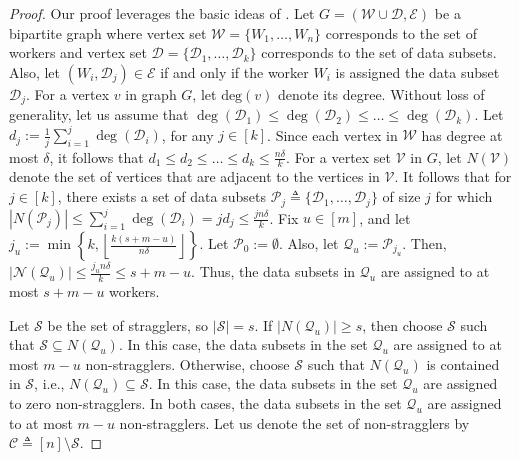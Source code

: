 \documentclass[journal,draftcls,onecolumn]{IEEEtran}
\theoremstyle{mystyle}
\newcommand{\floor}[1]{\left\lfloor #1\right\rfloor}
\begin{document}
\label{sec:lowerbound_proof}
\begin{proof}
Our proof leverages the basic ideas of \cite{dimakis_cyclic_mds}.
 Let $G = (\mathcal{W} \cup \mathcal{D}, \mathcal{E})$ be a bipartite graph where vertex set $\mathcal{W} = \{W_1 , \dots, W_n\}$ corresponds to the set of workers and vertex set $\mathcal{D} = \{ \mathcal{D}_1, \dots , \mathcal{D}_k\}$ corresponds to the set of data subsets. Also, let $(W_i,\mathcal{D}_j) \in \mathcal{E}$ if and only if the worker $W_i$ is assigned the data subset $\mathcal{D}_j$. For a vertex $v$ in graph $G$, let $\text{deg}(v)$ denote its degree. Without loss of generality, let us assume that $\deg(\mathcal{D}_1) \le \deg(\mathcal{D}_2) \le \dots \le \deg(\mathcal{D}_{k})$. Let $d_{j} := \frac{1}{j} \sum_{i = 1}^j \deg(\mathcal{D}_i)$, for any $j \in [k]$. Since each vertex in $\mathcal{W}$ has degree at most $\delta$, it follows that $d_1 \le d_2 \le \dots \le d_{k} \le \frac{n \delta}{k}$. For a vertex set $\mathcal{V}$ in $G$, let $N(\mathcal{V})$ denote the set of vertices that are adjacent to the vertices in $\mathcal{V}$. It follows that for $j \in [k]$, there exists a set of data subsets $\mathcal{P}_{j} \triangleq \{\mathcal{D}_1, \dots, \mathcal{D}_j\}$ of size $j$ for which $|N(\mathcal{P}_j)| \le \sum_{i = 1}^j \deg(\mathcal{D}_i) = jd_j \le {}\frac{jn \delta}{k}$. Fix $u \in [m]$,  and let
$
j_u:=\min\left\{k,
\left\lfloor\frac{k(s+m-u)}{n\delta}\right\rfloor\right\}$. Let $\mathcal{P}_0:=\emptyset$. Also, let $\mathcal{Q}_u:=\mathcal{P}_{j_u}$. Then,
$
|\mathcal{N}(\mathcal{Q}_u)|
\leq \frac{j_u n\delta}{k}
\leq s+m-u.
$
Thus, the data subsets in $\mathcal{Q}_u$ are assigned to at most
$s+m-u$ workers.

Let $\mathcal{S}$ be the set of stragglers, so $|\mathcal{S}| = s$. If $|N(\mathcal{Q}_u)| \ge s$, then choose $\mathcal{S}$ such that $\mathcal{S} \subseteq N(\mathcal{Q}_u)$. In this case, the data subsets in the set $\mathcal{Q}_u$ are assigned to at most $m-u$ non-stragglers. Otherwise, choose $\mathcal{S}$ such that $N(\mathcal{Q}_u)$ is contained in $\mathcal{S}$, i.e., $N(\mathcal{Q}_u) \subseteq \mathcal{S}$. In this case, the data subsets in the set $\mathcal{Q}_u$ are assigned to zero non-stragglers. In both cases, the data subsets in the set $\mathcal{Q}_u$ are assigned to at most $m-u$ non-stragglers. Let us denote the set of non-stragglers by $\mathcal{C} \triangleq [n] \setminus \mathcal{S}$.




\end{proof}
\end{document}
